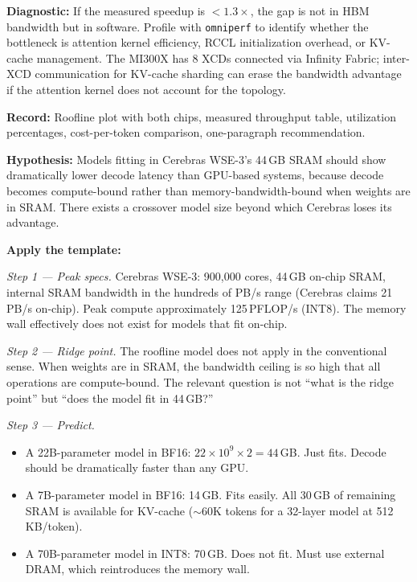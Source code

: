 \begin{exercise}
\textbf{Diagnostic:} If the measured speedup is $<1.3\times$, the gap is not in HBM bandwidth but in software. Profile with \texttt{omniperf} to identify whether the bottleneck is attention kernel efficiency, RCCL initialization overhead, or KV-cache management. The MI300X has 8 XCDs connected via Infinity Fabric; inter-XCD communication for KV-cache sharding can erase the bandwidth advantage if the attention kernel does not account for the topology.

\textbf{Record:} Roofline plot with both chips, measured throughput table, utilization percentages, cost-per-token comparison, one-paragraph recommendation.
\end{exercise}

\begin{exercise}
\textbf{Hypothesis:} Models fitting in Cerebras WSE-3's 44\,GB SRAM should show dramatically lower decode latency than GPU-based systems, because decode becomes compute-bound rather than memory-bandwidth-bound when weights are in SRAM. There exists a crossover model size beyond which Cerebras loses its advantage.

\textbf{Apply the template:}

\textit{Step 1 --- Peak specs.} Cerebras WSE-3: 900,000 cores, 44\,GB on-chip SRAM, internal SRAM bandwidth in the hundreds of PB/s range (Cerebras claims 21\,PB/s on-chip). Peak compute approximately 125\,PFLOP/s (INT8). The memory wall effectively does not exist for models that fit on-chip.

\textit{Step 2 --- Ridge point.} The roofline model does not apply in the conventional sense. When weights are in SRAM, the bandwidth ceiling is so high that all operations are compute-bound. The relevant question is not ``what is the ridge point'' but ``does the model fit in 44\,GB?''

\textit{Step 3 --- Predict.}
\begin{itemize}
  \item A 22B-parameter model in BF16: $22 \times 10^9 \times 2 = 44$\,GB. Just fits. Decode should be dramatically faster than any GPU.
  \item A 7B-parameter model in BF16: 14\,GB. Fits easily. All 30\,GB of remaining SRAM is available for KV-cache ($\sim$60K tokens for a 32-layer model at 512\,KB/token).
  \item A 70B-parameter model in INT8: 70\,GB. Does not fit. Must use external DRAM, which reintroduces the memory wall.
\end{itemize}


\end{exercise}
